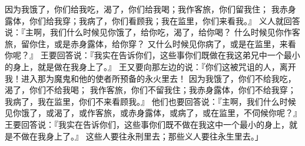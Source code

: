 {因为我饿了，你们给我吃，渴了，你们给我喝；我作客旅，你们留我住；
我赤身露体，你们给我穿；我病了，你们看顾我；我在监里，你们来看我。』
义人就回答说：『主啊，我们什么时候见你饿了，给你吃，渴了，给你喝？
什么时候见你作客旅，留你住，或是赤身露体，给你穿？
又什么时候见你病了，或是在监里，来看你呢？』
王要回答说：『我实在告诉你们，这些事你们既做在我这弟兄中一个最小的身上，就是做在我身上了。』
王又要向那左边的说：『你们这被咒诅的人，离开我！进入那为魔鬼和他的使者所预备的永火里去！
因为我饿了，你们不给我吃，渴了，你们不给我喝；
我作客旅，你们不留我住；我赤身露体，你们不给我穿；我病了，我在监里，你们不来看顾我。』
他们也要回答说：『主啊，我们什么时候见你饿了，或渴了，或作客旅，或赤身露体，或病了，或在监里，不伺候你呢？』
王要回答说：『我实在告诉你们，这些事你们既不做在我这{}中一个最小的身上，就是不做在我身上了。』
这些人要往永刑里去；那些义人要往永生里去。」

}
